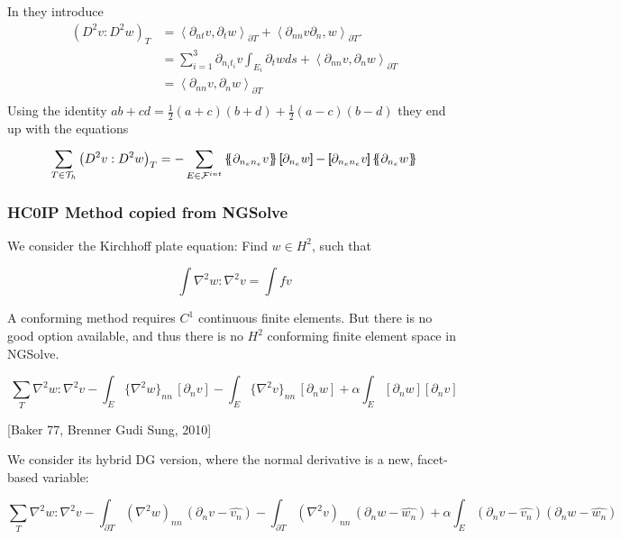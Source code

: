 In \cite{gu2012c0} they introduce \[
            \begin{split}
    \left( D^2v: D^2w \right)_{T } & = \left<\partial _{nt} v , \partial _{t} w  \right>_{\partial T} + \left< \partial
    _{nn} v
    \partial _{n}, w \right>_{\partial T}. \\
    &= \sum_{i=1}^{3} \partial _{n_{i} t_{i}} v \int_{E_{i}}^{} \partial _{t} w ds +\left< \partial
    _{nn} v,
    \partial _{n} w \right>_{\partial T}     \\
    &=\left< \partial
    _{nn} v,
    \partial _{n} w \right>_{\partial T}  \\
            \end{split}
    \]
    Using the identity $ab +cd = \frac{1}{2} (a+c)(b+d) + \frac{1}{2}(a-c)(b-d) $  they end up with the equations  \[
    \sum_{T \in \mathcal{T}_{h}  }^{} \left( D^2v: D^2w \right)_{T }  =
    - \sum_{E \in \mathcal{F} ^{int}}^{}  \mean{ \partial _{n_e n_{e}} v  } \jump{ \partial _{n_{e}} w } - \jump{
    \partial _{n_e n_{e}} v}  \mean{ \partial _{n_{e}} w }
\]

\subsubsection{HC0IP Method copied from NGSolve}%
\label{ssub:hc0ip_method_from_ngsolve}

We consider the Kirchhoff plate equation: Find $w \in H^2$, such that

$$
\int \nabla^2 w : \nabla^2 v = \int f v
$$

A conforming method requires $C^1$ continuous finite elements. But there is no good option available, and thus there is no $H^2$ conforming finite element space in NGSolve.

$$
\sum_T \nabla^2 w : \nabla^2 v
- \int_{E} \{\nabla^2 w\}_{nn} \, [\partial_n v]
- \int_{E} \{\nabla^2 v\}_{nn} \, [\partial_n w] + \alpha \int_E  [\partial_n w]  [\partial_n v]
$$

[Baker 77, Brenner Gudi Sung, 2010]

We consider its hybrid DG version, where the normal derivative is a new, facet-based variable:

$$
\sum_T \nabla^2 w : \nabla^2 v
- \int_{\partial T} (\nabla^2 w)_{nn} \, (\partial_n v - \widehat{v_n})
- \int_{\partial T} (\nabla^2 v)_{nn} \, (\partial_n w - \widehat{w_n}) + \alpha \int_E (\partial_n v - \widehat{v_n}) (\partial_n w - \widehat{w_n})
$$

